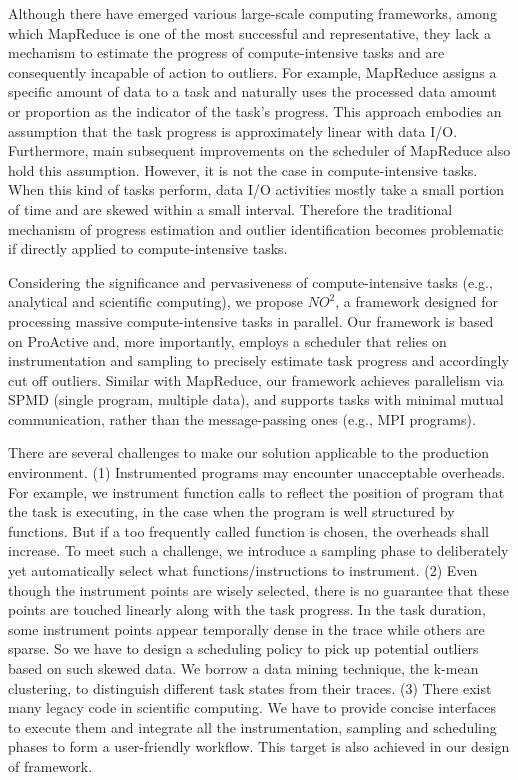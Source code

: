 Although there have emerged various large-scale computing frameworks, among which MapReduce is one of the most successful and representative, they lack a mechanism to estimate the progress of compute-intensive tasks and are consequently incapable of action to outliers. For example, MapReduce assigns a specific amount of data to a task and naturally uses the processed data amount or proportion as the indicator of the task's progress. This approach embodies an assumption that the task progress is approximately linear with data I/O. Furthermore, main subsequent improvements on the scheduler of MapReduce also hold this assumption. However, it is not the case in compute-intensive tasks. When this kind of tasks perform, data I/O activities mostly take a small portion of time and are skewed within a small interval. Therefore the traditional mechanism of progress estimation and outlier identification becomes problematic if directly applied to compute-intensive tasks.

Considering the significance and pervasiveness of compute-intensive tasks (e.g., analytical and scientific computing), we propose $NO^2$, a framework designed for processing massive compute-intensive tasks in parallel. Our framework is based on ProActive and, more importantly, employs a scheduler that relies on instrumentation and sampling to precisely estimate task progress and accordingly cut off outliers. Similar with MapReduce, our framework achieves parallelism via SPMD (single program, multiple data), and supports tasks with minimal mutual communication, rather than the message-passing ones (e.g., MPI programs).

There are several challenges to make our solution applicable to the production environment. (1) Instrumented programs may encounter unacceptable overheads. For example, we instrument function calls to reflect the position of program that the task is executing, in the case when the program is well structured by functions. But if a too frequently called function is chosen, the overheads shall increase. To meet such a challenge, we introduce a sampling phase to deliberately yet automatically select what functions/instructions to instrument. (2) Even though the instrument points are wisely selected, there is no guarantee that these points are touched linearly along with the task progress. In the task duration, some instrument points appear temporally dense in the trace while others are sparse. So we have to design a scheduling policy to pick up potential outliers based on such skewed data. We borrow a data mining technique, the k-mean clustering, to distinguish different task states from their traces. (3) There exist many legacy code in scientific computing. We have to provide concise interfaces to execute them and integrate all the instrumentation, sampling and scheduling phases to form a user-friendly workflow. This target is also achieved in our design of framework.

